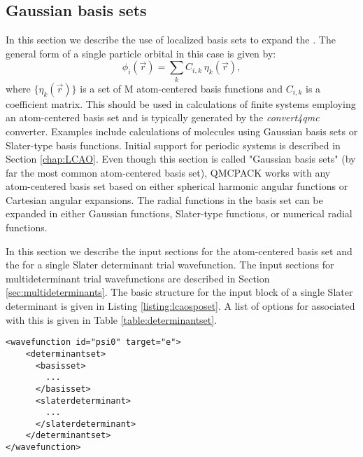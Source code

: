 \subsection{Gaussian basis sets}
\label{sec:gaussianbasis}

In this section we describe the use of localized basis sets to expand the . The general form of a single particle orbital in this case is given by:
\begin{equation}
\phi_i(\vec{r}) = \sum_k C_{i,k} \ \eta_k(\vec{r}),
\end{equation}
where $\{\eta_k(\vec{r})\}$ is a set of M atom-centered basis
functions and $C_{i,k}$ is a coefficient matrix. This 
should be used in calculations of finite systems employing an
atom-centered basis set and is typically generated by the
\textit{convert4qmc} converter.  Examples include calculations of
molecules using Gaussian basis sets or Slater-type basis
functions. Initial support for periodic systems is described in Section
\ref{chap:LCAO}. Even though this section is called "Gaussian basis
sets" (by far the most common atom-centered basis set), QMCPACK works
with any atom-centered basis set based on either spherical
harmonic angular functions or Cartesian angular expansions. The radial
functions in the basis set can be expanded in either Gaussian
functions, Slater-type functions, or numerical radial functions.

In this section we describe the input sections for the atom-centered basis set and the  for a single Slater determinant trial wavefunction. The input sections for multideterminant trial wavefunctions are described in Section \ref{sec:multideterminants}. The basic structure for the input block of a single Slater determinant is given in Listing \ref{listing:lcaosposet}.
A list of options for  associated with this  is given in Table \ref{table:determinantset}.

\begin{minipage}{\linewidth}
\begin{lstlisting}[style=QMCPXML,caption=Basic input block for a single determinant trial wavefunction using a \ixml{sposet} expanded on an atom-centered basis set. \label{listing:lcaosposet}]
<wavefunction id="psi0" target="e">
    <determinantset>
      <basisset>
        ...
      </basisset>
      <slaterdeterminant>
        ...
      </slaterdeterminant>
    </determinantset>    
</wavefunction>
\end{lstlisting}
\end{minipage}

